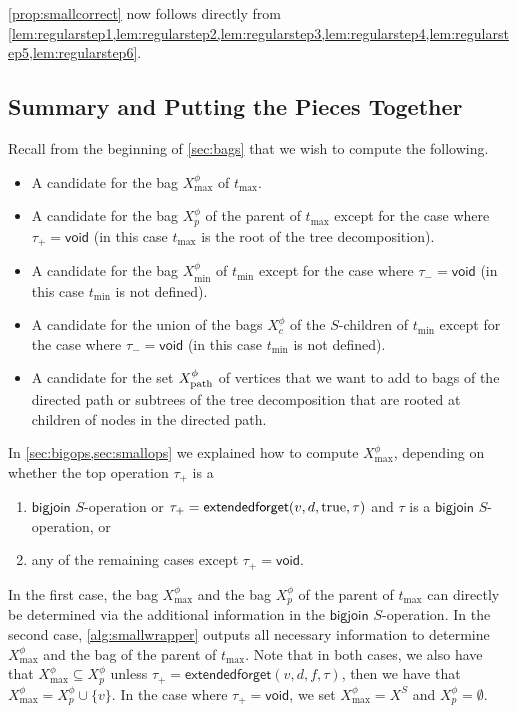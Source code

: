 \documentclass[a4paper,UKenglish,cleveref, autoref, thm-restate, numberwithinsect]{lipics-v2021}
\newcommand{\bigjoin}{\mathsf{bigjoin}}
\newcommand{\extendedforget}{\mathsf{extendedforget}}
\newcommand{\void}{\mathsf{void}}
\newcommand{\dpath}{\textup{path}}
\newcommand{\true}{\textup{true}}
\begin{document}
\cref{prop:smallcorrect} now follows directly from \cref{lem:regularstep1,lem:regularstep2,lem:regularstep3,lem:regularstep4,lem:regularstep5,lem:regularstep6}.

\subsection{Summary and Putting the Pieces Together}\label{sec:pieces}

Recall from the beginning of \cref{sec:bags} that we wish to compute the following.
\begin{itemize}
    \item A candidate for the bag $X^\phi_{\max}$ of $t_{\max}$.
    \item A candidate for the bag $X_p^\phi$ of the parent of $t_{\max}$ except for the case where $\tau_+=\void$ (in this case $t_{\max}$ is the root of the tree decomposition).
    \item A candidate for the bag $X^\phi_{\min}$ of $t_{\min}$ except for the case where $\tau_-=\void$ (in this case $t_{\min}$ is not defined).
    \item A candidate for the union of the bags $X_c^\phi$ of the $S$-children of $t_{\min}$ except for the case where $\tau_-=\void$ (in this case $t_{\min}$ is not defined).
    \item A candidate for the set $X^\phi_{\dpath}$ of vertices that we want to add to bags of the directed path or subtrees of the tree decomposition that are rooted at children of nodes in the directed path.
\end{itemize}


In \cref{sec:bigops,sec:smallops} we explained how to compute $X^\phi_{\max}$, depending on whether the top operation $\tau_+$ is a 
\begin{enumerate}
\item $\bigjoin$ $S$-operation or $\tau_+=\extendedforget(v,d,\true,\tau)$ and $\tau$ is a $\bigjoin$ $S$-operation, or
\item any of the remaining cases except $\tau_+=\void$.
\end{enumerate}
In the first case, the bag $X^\phi_{\max}$ and the bag $X_p^\phi$ of the parent of $t_{\max}$ can directly be determined via the additional information in the $\bigjoin$ $S$-operation. 
In the second case, \cref{alg:smallwrapper} outputs all necessary information to determine $X^\phi_{\max}$ and the bag of the parent of $t_{\max}$.
Note that in both cases, we also have that $X^\phi_{\max}\subseteq X_p^\phi$ unless $\tau_+=\extendedforget(v,d,f,\tau)$, then we have that $X^\phi_{\max}= X_p^\phi\cup\{v\}$.
In the case where $\tau_+=\void$, we set $X^\phi_{\max}=X^S$ and $X_p^\phi=\emptyset$.
\end{document}
